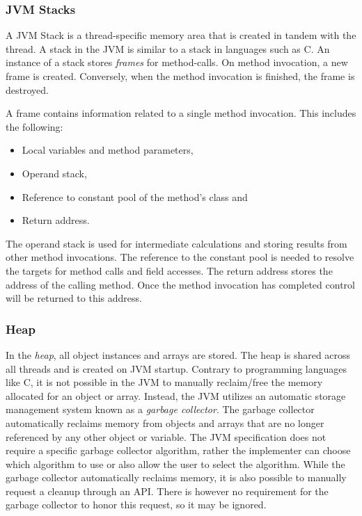 \subsubsection{JVM Stacks}

A JVM Stack is a thread-specific memory area that is created in tandem with the thread. A stack in the JVM is similar to a stack in languages such as C. An instance of a stack stores \textit{frames} for method-calls. On method invocation, a new frame is created. Conversely, when the method invocation is finished, the frame is destroyed. 

A frame contains information related to a single method invocation. This includes the following:

\begin{itemize}
    \item Local variables and method parameters,
    \item Operand stack,
    \item Reference to constant pool of the method's class and
    \item Return address.
\end{itemize}

The operand stack is used for intermediate calculations and storing results from other method invocations. The reference to the constant pool is needed to resolve the targets for method calls and field accesses. The return address stores the address of the calling method. Once the method invocation has completed control will be returned to this address.

\subsubsection{Heap}

In the \textit{heap}, all object instances and arrays are stored. The heap is shared across all threads and is created on JVM startup. Contrary to programming languages like C, it is not possible in the JVM to manually reclaim/free the memory allocated for an object or array. Instead, the JVM utilizes an automatic storage management system known as a \textit{garbage collector}. The garbage collector automatically reclaims memory from objects and arrays that are no longer referenced by any other object or variable. The JVM specification does not require a specific garbage collector algorithm, rather the implementer can choose which algorithm to use or also allow the user to select the algorithm. While the garbage collector automatically reclaims memory, it is also possible to manually request a cleanup through an API. There is however no requirement for the garbage collector to honor this request, so it may be ignored. 

